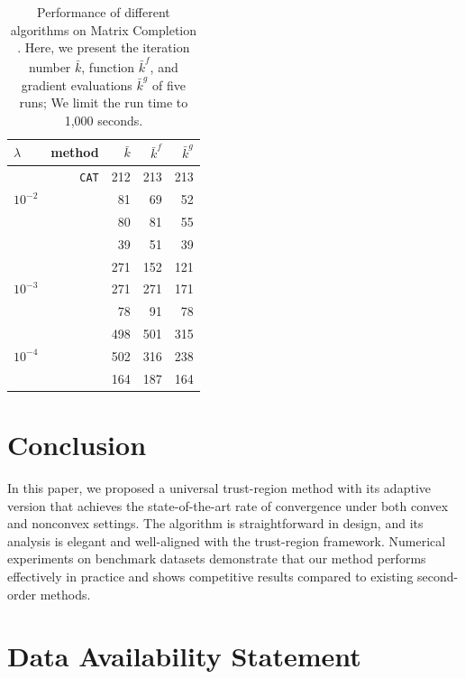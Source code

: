 \begin{table}[h]
\centering
\caption{Performance of different algorithms on Matrix Completion \citep{hamad2022consistently}. Here, we present the  iteration number $\bar k$, function $\bar k^f$, and gradient evaluations $\bar k^g$ of five runs;  We limit the run time to 1,000 seconds. }
\label{tab.matcom}
\begin{tabular}{lrrrr}
\toprule
$\lambda$ & method & $\bar k$ & $\bar k^f$ & $\bar k^g$ \\
\midrule
\multirow{3}{*}{$10^{-2}$} & \texttt{CAT}    & 212   & 213    & 213 \\
                      & \arc{}           & 81       & 69    & 52 \\
                      & \newtontrst{}    & 80       & 81   & 55 \\
                      & \iutrhvp{}        & 39       & 51    & 39 \\
                      \midrule
\multirow{3}{*}{$10^{-3}$} & \arc{}           & 271       &  152 & 121 \\
                      & \newtontrst{}    & 271       & 271    & 171 \\
                      & \iutrhvp{}        & 78       & 91    & 78 \\
                      \midrule
\multirow{3}{*}{$10^{-4}$}& \arc{}           & 498       & 501    & 315 \\
                      & \newtontrst{}    & 502       & 316    & 238 \\
                      & \iutrhvp{}        & 164       & 187    & 164 \\
\bottomrule
\end{tabular}
\end{table}

\section{Conclusion}
In this paper, we proposed a universal trust-region method with its adaptive version that achieves the state-of-the-art rate of convergence under both convex and nonconvex settings. The algorithm is straightforward in design, and its analysis is elegant and well-aligned with the trust-region framework. Numerical experiments on benchmark datasets demonstrate that our method performs effectively in practice and shows competitive results compared to existing second-order methods.
\newpage
\section*{Data Availability Statement}

